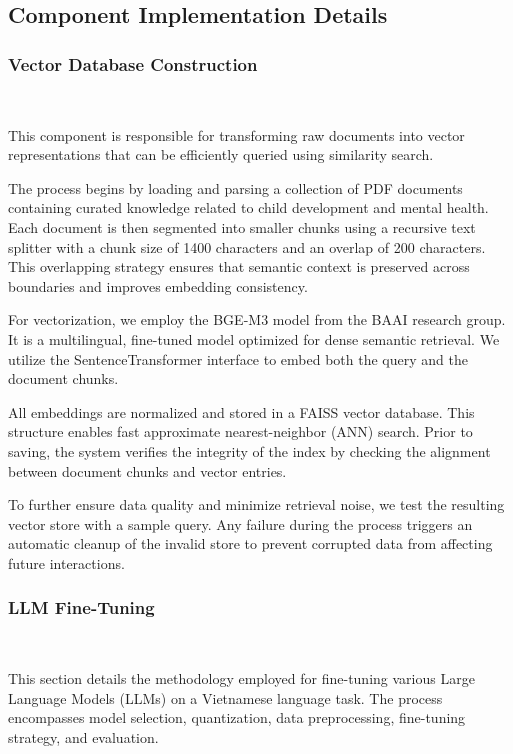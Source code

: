 \documentclass[runningheads]{llncs}
\begin{document}
\subsection{Component Implementation Details}
\label{sec:Component Implementation Details}
\subsubsection{Vector Database Construction}\mbox{}\\
\label{sec:Vector Database Construction}

This component is responsible for transforming raw documents into vector representations that can be efficiently queried using similarity search.

The process begins by loading and parsing a collection of PDF documents containing curated knowledge related to child development and mental health. Each document is then segmented into smaller chunks using a recursive text splitter with a chunk size of 1400 characters and an overlap of 200 characters. This overlapping strategy ensures that semantic context is preserved across boundaries and improves embedding consistency.

For vectorization, we employ the BGE-M3 model from the BAAI research group. It is a multilingual, fine-tuned model optimized for dense semantic retrieval. We utilize the SentenceTransformer interface to embed both the query and the document chunks.

All embeddings are normalized and stored in a FAISS vector database. This structure enables fast approximate nearest-neighbor (ANN) search. Prior to saving, the system verifies the integrity of the index by checking the alignment between document chunks and vector entries.

To further ensure data quality and minimize retrieval noise, we test the resulting vector store with a sample query. Any failure during the process triggers an automatic cleanup of the invalid store to prevent corrupted data from affecting future interactions.

\subsubsection{LLM Fine-Tuning}\mbox{}\\
\label{sec:LLM Fine-Tuning}

This section details the methodology employed for fine-tuning various Large Language Models (LLMs) on a Vietnamese language task. The process encompasses model selection, quantization, data preprocessing, fine-tuning strategy, and evaluation.
\end{document}
